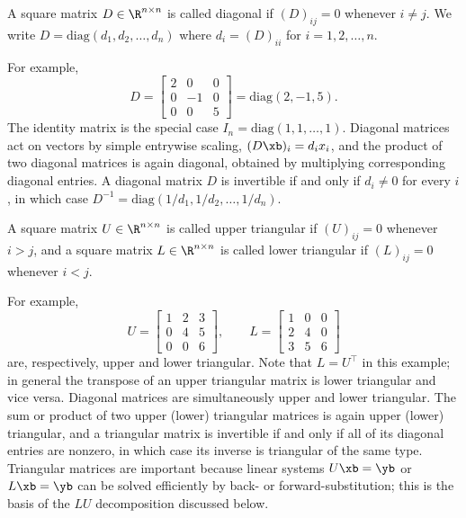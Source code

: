 \begin{definition}
    A square matrix $D \in \R^{n \times n}$ is called diagonal if $(D)_{ij} = 0$ whenever $i \neq j$. We write $D = \mathrm{diag}(d_1, d_2, \ldots, d_n)$ where $d_i = (D)_{ii}$ for $i=1,2,\ldots,n$.
\end{definition}
For example,
\begin{equation*}
    D = \begin{bmatrix}
        2 & 0 & 0 \\
        0 & -1 & 0 \\
        0 & 0 & 5
    \end{bmatrix} = \mathrm{diag}(2,-1,5).
\end{equation*}
The identity matrix is the special case $I_n = \mathrm{diag}(1,1,\ldots,1)$. Diagonal matrices act on vectors by simple entrywise scaling, $(D\xb)_i = d_i x_i$, and the product of two diagonal matrices is again diagonal, obtained by multiplying corresponding diagonal entries. A diagonal matrix $D$ is invertible if and only if $d_i \neq 0$ for every $i$, in which case $D^{-1} = \mathrm{diag}(1/d_1, 1/d_2, \ldots, 1/d_n)$.

\begin{definition}
    A square matrix $U \in \R^{n \times n}$ is called upper triangular if $(U)_{ij} = 0$ whenever $i > j$, and a square matrix $L \in \R^{n \times n}$ is called lower triangular if $(L)_{ij} = 0$ whenever $i < j$.
\end{definition}
For example,
\begin{equation*}
    U = \begin{bmatrix}
        1 & 2 & 3 \\
        0 & 4 & 5 \\
        0 & 0 & 6
    \end{bmatrix}, \qquad
    L = \begin{bmatrix}
        1 & 0 & 0 \\
        2 & 4 & 0 \\
        3 & 5 & 6
    \end{bmatrix}
\end{equation*}
are, respectively, upper and lower triangular. Note that $L = U^\top$ in this example; in general the transpose of an upper triangular matrix is lower triangular and vice versa. Diagonal matrices are simultaneously upper and lower triangular. The sum or product of two upper (lower) triangular matrices is again upper (lower) triangular, and a triangular matrix is invertible if and only if all of its diagonal entries are nonzero, in which case its inverse is triangular of the same type. Triangular matrices are important because linear systems $U\xb = \yb$ or $L\xb = \yb$ can be solved efficiently by back- or forward-substitution; this is the basis of the $LU$ decomposition discussed below.

